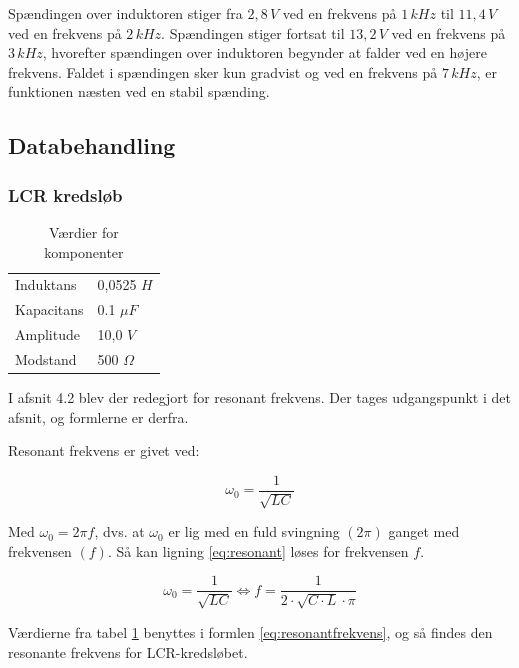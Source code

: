 Spændingen over induktoren stiger fra $2,8\, V$ ved en frekvens på $1\, kHz$ til $11,4\, V$ ved en frekvens på $2\, kHz$. Spændingen stiger fortsat til $13,2\, V$ ved en frekvens på $3\, kHz$, hvorefter spændingen over induktoren begynder at falder ved en højere frekvens. Faldet i spændingen sker kun gradvist og ved en frekvens på $7\, kHz$, er funktionen næsten ved en stabil spænding.

\subsection{Databehandling}

\subsubsection{LCR kredsløb}

\begin{table}[H]
\centering
\begin{tabular}{l|l}
Induktans  & 0,0525 $H$ \\ 
Kapacitans & 0.1 $\mu F$   \\
Amplitude  & 10,0 $V$   \\
Modstand   & 500 $\Omega$ \\
\end{tabular}
\caption{Værdier for komponenter}
\label{tabular:value}
\end{table}

I afsnit 4.2 blev der redegjort for resonant frekvens. Der tages udgangspunkt i det afsnit, og formlerne er derfra.

Resonant frekvens er givet ved:

\begin{equation} 
\omega_0 = \frac{1}{\sqrt{LC}}
\label{eq:resonant}
\end{equation}

Med $\omega_0 = 2 \pi f$, dvs. at $\omega_0$ er lig med en fuld svingning $(2\pi)$ ganget med frekvensen $(f)$. Så kan ligning \ref{eq:resonant} løses for frekvensen $f$. \cite{fysikbog}

\begin{equation} 
\omega_0 = \frac{1}{\sqrt{LC}} \Leftrightarrow f = \frac{1}{2 \cdot \sqrt{C \cdot L} \cdot \pi}
\label{eq:resonantfrekvens}
\end{equation}

Værdierne fra tabel \ref{tabular:value} benyttes i formlen \ref{eq:resonantfrekvens}, og så findes den resonante frekvens for LCR-kredsløbet.

